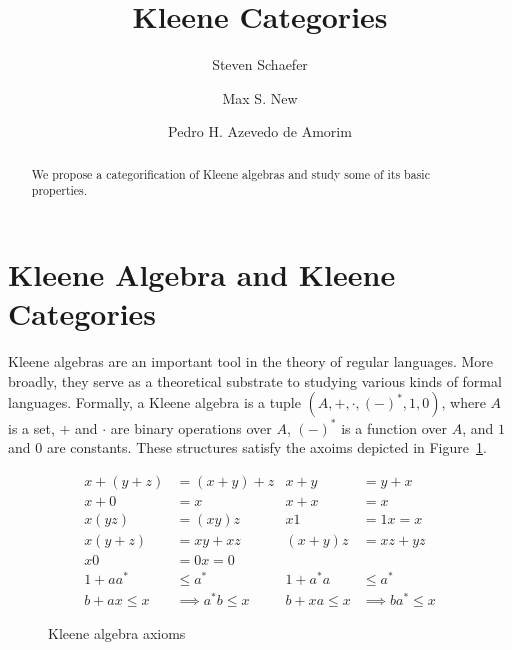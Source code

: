 \documentclass[acmsmall,anonymous,review,screen]{acmart}
\begin{document}
\title{Kleene Categories}
\author{Steven Schaefer}

\author{Max S. New}

\author{Pedro H. Azevedo de Amorim}

\begin{abstract}
  We propose a categorification of Kleene algebras and study some of its basic properties.
\end{abstract}

\maketitle


\section{Kleene Algebra and Kleene Categories}

Kleene algebras are an important tool in the theory of regular
languages. More broadly, they serve as a theoretical substrate to
studying various kinds of formal languages. Formally, a Kleene algebra is a tuple
$(A, +, \cdot, (-)^*, 1, 0)$, where $A$ is a set, $+$ and $\cdot$
are binary operations over $A$, $(-)^*$ is a function over $A$, and
$1$ and $0$ are constants. These structures satisfy the axoims depicted
in Figure~\ref{fig:axioms}.

\begin{figure}
  \begin{align*}
    x + (y + z) &= (x + y) + z & x + y &= y + x\\
    x + 0 &= x & x + x &= x\\
    x(yz) &= (xy)z & x1 &= 1x = x\\
    x(y + z) &= xy + xz & (x + y)z &= xz + yz\\
    x0 &= 0x = 0 & & \\
    1 + aa^* &\leq a^* & 1 + a^*a &\leq a^*\\
     b + ax \leq x &\implies a^*b \leq x &  b + xa \leq x &\implies ba^* \leq x
  \end{align*}
  \label{fig:axioms}
  \caption{Kleene algebra axioms}
\end{figure}
\end{document}
